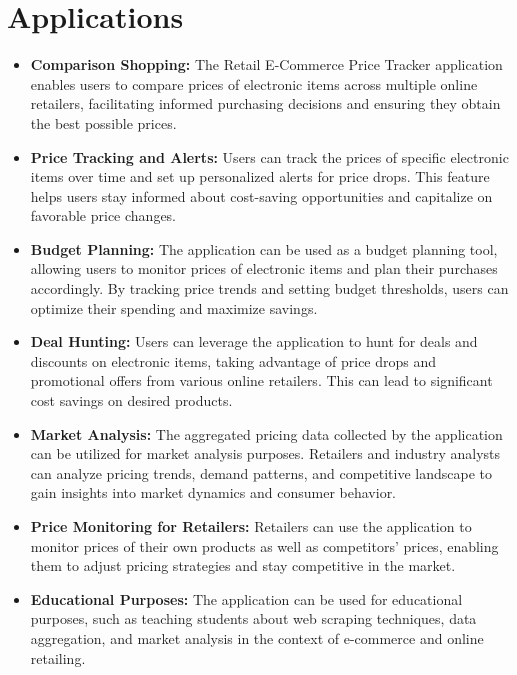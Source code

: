 \documentclass[a4paper,14pt,onecolumn]{report}
\begin{document}
	\section{Applications}
	\begin{itemize}
		\item \textbf{Comparison Shopping:} The Retail E-Commerce Price Tracker application enables users to compare prices of electronic items across multiple online retailers, facilitating informed purchasing decisions and ensuring they obtain the best possible prices.
		
		\item \textbf{Price Tracking and Alerts:} Users can track the prices of specific electronic items over time and set up personalized alerts for price drops. This feature helps users stay informed about cost-saving opportunities and capitalize on favorable price changes.
		
		\item \textbf{Budget Planning:} The application can be used as a budget planning tool, allowing users to monitor prices of electronic items and plan their purchases accordingly. By tracking price trends and setting budget thresholds, users can optimize their spending and maximize savings.
		
		\item \textbf{Deal Hunting:} Users can leverage the application to hunt for deals and discounts on electronic items, taking advantage of price drops and promotional offers from various online retailers. This can lead to significant cost savings on desired products.
		
		\item \textbf{Market Analysis:} The aggregated pricing data collected by the application can be utilized for market analysis purposes. Retailers and industry analysts can analyze pricing trends, demand patterns, and competitive landscape to gain insights into market dynamics and consumer behavior.
		
		\item \textbf{Price Monitoring for Retailers:} Retailers can use the application to monitor prices of their own products as well as competitors' prices, enabling them to adjust pricing strategies and stay competitive in the market.
		
		\item \textbf{Educational Purposes:} The application can be used for educational purposes, such as teaching students about web scraping techniques, data aggregation, and market analysis in the context of e-commerce and online retailing.
	\end{itemize}
	
\end{document}
